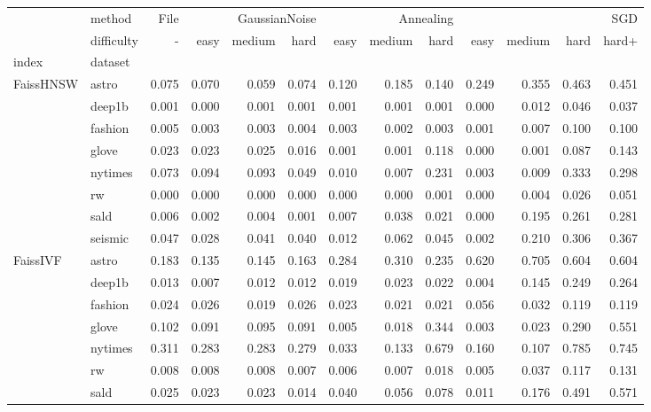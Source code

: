 \begin{tabular}{llrrrrrrrrrrr}
\toprule
 & method & File & \multicolumn{3}{r}{GaussianNoise} & \multicolumn{3}{r}{Annealing} & \multicolumn{4}{r}{SGD} \\
 & difficulty & - & easy & medium & hard & easy & medium & hard & easy & medium & hard & hard+ \\
index & dataset &  &  &  &  &  &  &  &  &  &  &  \\
\midrule
\multirow[t]{8}{*}{FaissHNSW} & astro & 0.075 & 0.070 & 0.059 & 0.074 & 0.120 & 0.185 & 0.140 & 0.249 & 0.355 & 0.463 & 0.451 \\
 & deep1b & 0.001 & 0.000 & 0.001 & 0.001 & 0.001 & 0.001 & 0.001 & 0.000 & 0.012 & 0.046 & 0.037 \\
 & fashion & 0.005 & 0.003 & 0.003 & 0.004 & 0.003 & 0.002 & 0.003 & 0.001 & 0.007 & 0.100 & 0.100 \\
 & glove & 0.023 & 0.023 & 0.025 & 0.016 & 0.001 & 0.001 & 0.118 & 0.000 & 0.001 & 0.087 & 0.143 \\
 & nytimes & 0.073 & 0.094 & 0.093 & 0.049 & 0.010 & 0.007 & 0.231 & 0.003 & 0.009 & 0.333 & 0.298 \\
 & rw & 0.000 & 0.000 & 0.000 & 0.000 & 0.000 & 0.000 & 0.001 & 0.000 & 0.004 & 0.026 & 0.051 \\
 & sald & 0.006 & 0.002 & 0.004 & 0.001 & 0.007 & 0.038 & 0.021 & 0.000 & 0.195 & 0.261 & 0.281 \\
 & seismic & 0.047 & 0.028 & 0.041 & 0.040 & 0.012 & 0.062 & 0.045 & 0.002 & 0.210 & 0.306 & 0.367 \\
\cline{1-13}
\multirow[t]{8}{*}{FaissIVF} & astro & 0.183 & 0.135 & 0.145 & 0.163 & 0.284 & 0.310 & 0.235 & 0.620 & 0.705 & 0.604 & 0.604 \\
 & deep1b & 0.013 & 0.007 & 0.012 & 0.012 & 0.019 & 0.023 & 0.022 & 0.004 & 0.145 & 0.249 & 0.264 \\
 & fashion & 0.024 & 0.026 & 0.019 & 0.026 & 0.023 & 0.021 & 0.021 & 0.056 & 0.032 & 0.119 & 0.119 \\
 & glove & 0.102 & 0.091 & 0.095 & 0.091 & 0.005 & 0.018 & 0.344 & 0.003 & 0.023 & 0.290 & 0.551 \\
 & nytimes & 0.311 & 0.283 & 0.283 & 0.279 & 0.033 & 0.133 & 0.679 & 0.160 & 0.107 & 0.785 & 0.745 \\
 & rw & 0.008 & 0.008 & 0.008 & 0.007 & 0.006 & 0.007 & 0.018 & 0.005 & 0.037 & 0.117 & 0.131 \\
 & sald & 0.025 & 0.023 & 0.023 & 0.014 & 0.040 & 0.056 & 0.078 & 0.011 & 0.176 & 0.491 & 0.571 \\

\end{tabular}
